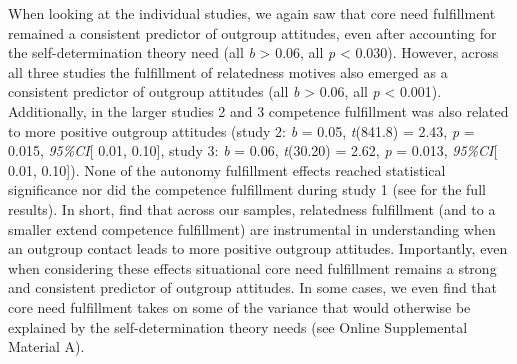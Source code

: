 When looking at the individual studies, we again saw that core need
fulfillment remained a consistent predictor of outgroup attitudes, even
after accounting for the self-determination theory need (all
\textbar{}\textit{b}\textbar{} \textgreater{} 0.06, all \textit{p}
\textless{} 0.030). However, across all three studies the fulfillment of
relatedness motives also emerged as a consistent predictor of outgroup
attitudes (all \textbar{}\textit{b}\textbar{} \textgreater{} 0.06, all
\textit{p} \textless{} 0.001). Additionally, in the larger studies 2 and
3 competence fulfillment was also related to more positive outgroup
attitudes (study 2: \textit{b} = 0.05, \textit{t}(841.8) = 2.43,
\textit{p} = 0.015, \textit{95\%CI}{[} 0.01, 0.10{]}, study 3:
\textit{b} = 0.06, \textit{t}(30.20) = 2.62, \textit{p} = 0.013,
\textit{95\%CI}{[} 0.01, 0.10{]}). None of the autonomy fulfillment
effects reached statistical significance nor did the competence
fulfillment during study 1 (see  for the
full results). In short, find that across our samples, relatedness
fulfillment (and to a smaller extend competence fulfillment) are
instrumental in understanding when an outgroup contact leads to more
positive outgroup attitudes. Importantly, even when considering these
effects situational core need fulfillment remains a strong and
consistent predictor of outgroup attitudes. In some cases, we even find
that core need fulfillment takes on some of the variance that would
otherwise be explained by the self-determination theory needs (see
Online Supplemental Material A).

